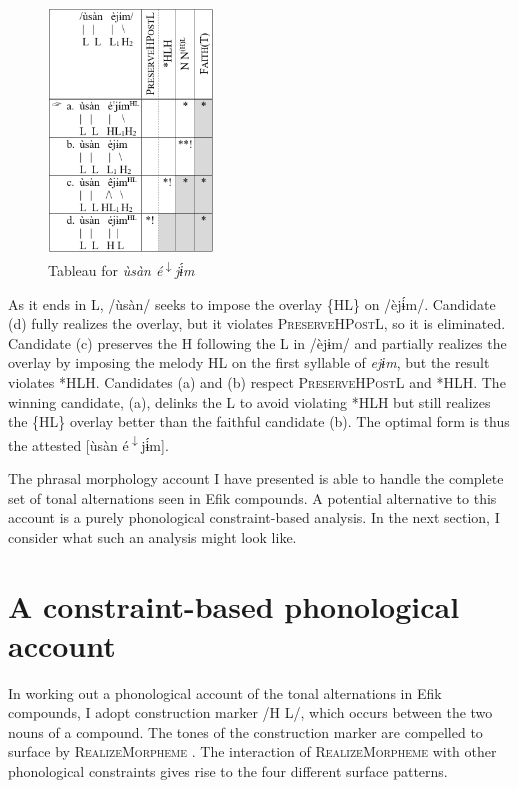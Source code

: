 \documentclass[output=paper]{langscibook}
\begin{document}
  
\begin{figure}
\includegraphics[width=44mm]{figures/glewwe-img5.png}
\caption{Tableau for \textit{ùsàn é\textsuperscript{$\downarrow$}jɨ́m}}
\label{fig:glewwe:6}
\end{figure}

As it ends in L, /ùsàn/ seeks to impose the overlay \{HL\} on /èjɨ́m/. Candidate (d) fully realizes the overlay, but it violates \textsc{PreserveHPostL}, so it is eliminated. Candidate (c) preserves the H following the L in /èjɨm/ and partially realizes the overlay by imposing the melody HL on the first syllable of \textit{ejɨm}, but the result violates *HLH. Candidates (a) and (b) respect \textsc{PreserveHPostL} and *HLH. The winning candidate, (a), delinks the L to avoid violating *HLH but still realizes the \{HL\} overlay better than the faithful candidate (b). The optimal form is thus the attested [ùsàn é\textsuperscript{$\downarrow$}jɨ́m]. 

The phrasal morphology account I have presented is able to handle the complete set of tonal alternations seen in Efik compounds. A potential alternative to this account is a purely phonological constraint-based analysis. In the next section, I consider what such an analysis might look like. 
 
\section{A constraint-based phonological account}\label{sec:glewwe:3}

In working out a phonological account of the tonal alternations in Efik compounds, I adopt  construction marker /H L/, which occurs between the two nouns of a compound. The tones of the construction marker are compelled to surface by \textsc{RealizeMorpheme} \citep{Gnanadesikan1997,Kurisu2001,Oostendorp2005}. The interaction of \textsc{RealizeMorpheme} with other phonological constraints gives rise to the four different surface patterns. 
\end{document}
